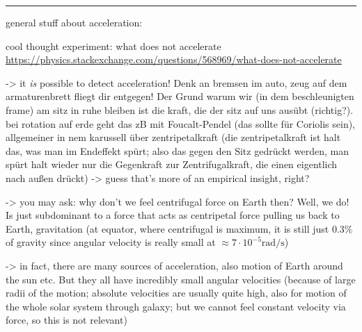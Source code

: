 \documentclass[../class_mech_main.tex]{subfiles}
\begin{document}
\hrule

general stuff about acceleration:

cool thought experiment: what does not accelerate \url{https://physics.stackexchange.com/questions/568969/what-does-not-accelerate}


-> it \emph{is} possible to detect acceleration! Denk an bremsen im auto, zeug auf dem armaturenbrett fliegt dir entgegen! Der Grund warum wir (in dem beschleunigten frame) am sitz in ruhe bleiben ist die kraft, die der sitz auf uns ausübt (richtig?). bei rotation auf erde geht das zB mit Foucalt-Pendel (das sollte für Coriolis sein), allgemeiner in nem karussell über zentripetalkraft (die zentripetalkraft ist halt das, was man im Endeffekt spürt; also das gegen den Sitz gedrückt werden, man spürt halt wieder nur die Gegenkraft zur Zentrifugalkraft, die einen eigentlich nach außen drückt) -> guess that's more of an empirical insight, right?

-> you may ask: why don't we feel centrifugal force on Earth then? Well, we do! Is just subdominant to a force that acts as centripetal force pulling us back to Earth, gravitation (at equator, where centrifugal is maximum, it is still just $0.3\%$ of gravity since angular velocity is really small at $\approx 7 \cdot 10^{-5} \unit{ \radian\per\second}$)

-> in fact, there are many sources of acceleration, also motion of Earth around the sun etc. But they all have incredibly small angular velocities (because of large radii of the motion; absolute velocities are usually quite high, also for motion of the whole solar system through galaxy; but we cannot feel constant velocity via force, so this is not relevant)
\end{document}
